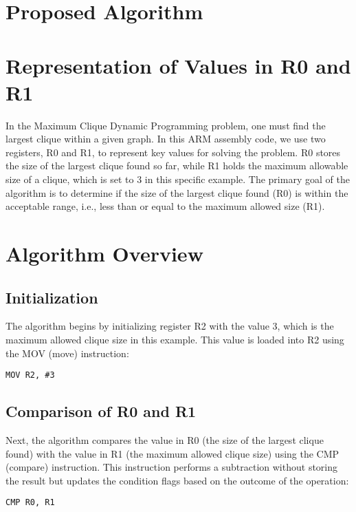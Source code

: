 \section{Proposed Algorithm}
\label{sec:algorithm}

\section{Representation of Values in R0 and R1}

In the Maximum Clique Dynamic Programming problem, one must find the largest clique within a given graph. In this ARM assembly code, we use two registers, R0 and R1, to represent key values for solving the problem. R0 stores the size of the largest clique found so far, while R1 holds the maximum allowable size of a clique, which is set to 3 in this specific example. The primary goal of the algorithm is to determine if the size of the largest clique found (R0) is within the acceptable range, i.e., less than or equal to the maximum allowed size (R1).

\section{Algorithm Overview}

\subsection{Initialization}

The algorithm begins by initializing register R2 with the value 3, which is the maximum allowed clique size in this example. This value is loaded into R2 using the MOV (move) instruction:

\begin{verbatim}
MOV R2, #3
\end{verbatim}

\subsection{Comparison of R0 and R1}

Next, the algorithm compares the value in R0 (the size of the largest clique found) with the value in R1 (the maximum allowed clique size) using the CMP (compare) instruction. This instruction performs a subtraction without storing the result but updates the condition flags based on the outcome of the operation:

\begin{verbatim}
CMP R0, R1
\end{verbatim}

